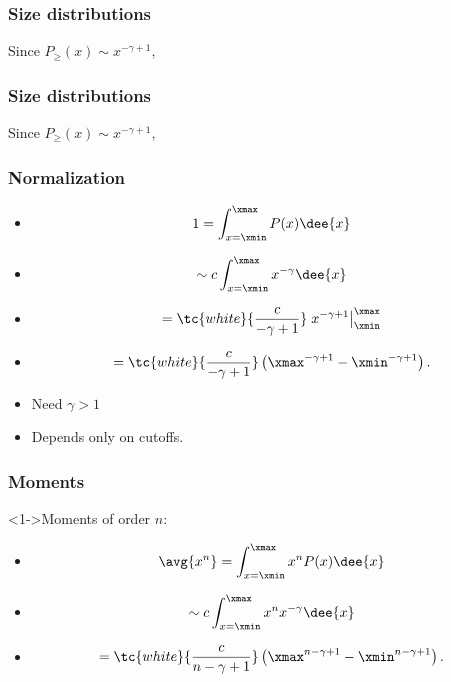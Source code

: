 \begin{frame}
  \frametitle{Size distributions}

Since $P_\ge(x) \sim x^{-\gamma+1}$,


\end{frame}

\begin{frame}
  \frametitle{Size distributions}

Since $P_\ge(x) \sim x^{-\gamma+1}$,




\end{frame}

\begin{frame}
  \frametitle{Normalization}

  \begin{itemize}
  \item<1-> 
    $$ 1 = \int_{x=\xmin}^{\xmax} P(x) \dee{x} $$
  \item<2-> 
    $$ \sim c \int_{x=\xmin}^{\xmax} x^{-\gamma} \dee{x} $$
  \item<3-> 
    $$ = \tc{white}{\frac{c}{-\gamma+1}} \left.
      x^{-\gamma+1}
    \right|_{\xmin}^{\xmax}
    $$
  \item<4-> 
    $$ = \tc{white}{\frac{c}{-\gamma+1}} \left(
      \xmax^{-\gamma+1}
      -
      \xmin^{-\gamma+1}
    \right).
    $$
  \item<5-> 
    \mbox{}\hfill Need $\gamma>1$\\
  \item<6-> 
    \mbox{}\hfill Depends only on cutoffs.
  \end{itemize}

\end{frame}

\begin{frame}
  \frametitle{Moments}

  \begin{block}<1->{Moments of order $n$:}
    \begin{itemize}
    \item<1-> 
$$ \avg{x^n} = \int_{x=\xmin}^{\xmax} x^n P(x) \dee{x} $$
    \item<2-> 
$$ \sim c \int_{x=\xmin}^{\xmax} x^n x^{-\gamma} \dee{x} $$
    \item<3-> 
$$ = \tc{white}{\frac{c}{n-\gamma+1}} \left(
  \xmax^{n-\gamma+1} - \xmin^{n-\gamma+1} \right).
$$
    \end{itemize}
  \end{block}

\end{frame}


